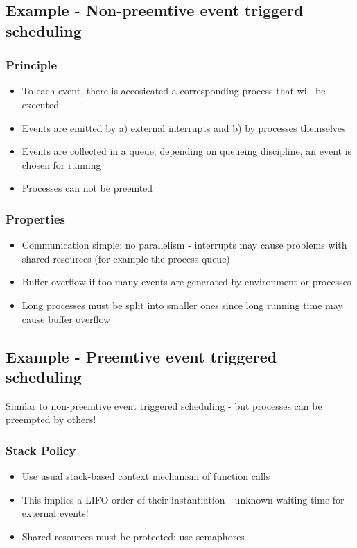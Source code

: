 \subsection{Example - Non-preemtive event triggerd scheduling}


\subsubsection{Principle}

\begin{itemize}[noitemsep]
\item To each event, there is accosicated a corresponding process that will be executed
\item Events are emitted by a) external interrupts and b) by processes themselves
\item Events are collected in a queue; depending on queueing discipline, an event is chosen for running
\item Processes can not be preemted
\end{itemize}

\subsubsection{Properties}

\begin{itemize}[noitemsep]
\item Communication simple; no parallelism - interrupts may cause problems with shared resources (for example the process queue)
\item Buffer overflow if too many events are generated by environment or processes
\item Long processes must be split into smaller ones since long running time may cause buffer overflow
\end{itemize}


\subsection{Example - Preemtive event triggered scheduling}

Similar to non-preemtive event triggered scheduling - but processes can be preempted by others!

\subsubsection{Stack Policy}

\begin{itemize}[noitemsep]
\item Use usual stack-based context mechanism of function calls
\item This implies a LIFO order of their instantiation - unknown waiting time for external events!
\item Shared resources must be protected: use semaphores 
\end{itemize}



